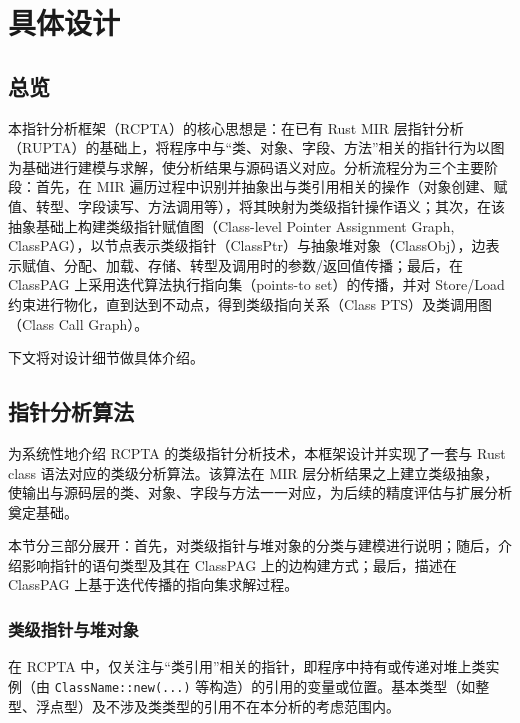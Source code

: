 
\section{具体设计}

\subsection{总览}

本指针分析框架（RCPTA）的核心思想是：在已有 Rust MIR 层指针分析（RUPTA）的基础上，将程序中与“类、对象、字段、方法”相关的指针行为以图为基础进行建模与求解，使分析结果与源码语义对应。分析流程分为三个主要阶段：首先，在 MIR 遍历过程中识别并抽象出与类引用相关的操作（对象创建、赋值、转型、字段读写、方法调用等），将其映射为类级指针操作语义；其次，在该抽象基础上构建类级指针赋值图（Class-level Pointer Assignment Graph, ClassPAG），以节点表示类级指针（ClassPtr）与抽象堆对象（ClassObj），边表示赋值、分配、加载、存储、转型及调用时的参数/返回值传播；最后，在 ClassPAG 上采用迭代算法执行指向集（points-to set）的传播，并对 Store/Load 约束进行物化，直到达到不动点，得到类级指向关系（Class PTS）及类调用图（Class Call Graph）。

下文将对设计细节做具体介绍。

\subsection{指针分析算法}

为系统性地介绍 RCPTA 的类级指针分析技术，本框架设计并实现了一套与 Rust class 语法对应的类级分析算法。该算法在 MIR 层分析结果之上建立类级抽象，使输出与源码层的类、对象、字段与方法一一对应，为后续的精度评估与扩展分析奠定基础。

本节分三部分展开：首先，对类级指针与堆对象的分类与建模进行说明；随后，介绍影响指针的语句类型及其在 ClassPAG 上的边构建方式；最后，描述在 ClassPAG 上基于迭代传播的指向集求解过程。

\subsubsection{\heiti 类级指针与堆对象}

在 RCPTA 中，仅关注与“类引用”相关的指针，即程序中持有或传递对堆上类实例（由 \texttt{ClassName::new(...)} 等构造）的引用的变量或位置。基本类型（如整型、浮点型）及不涉及类类型的引用不在本分析的考虑范围内。

